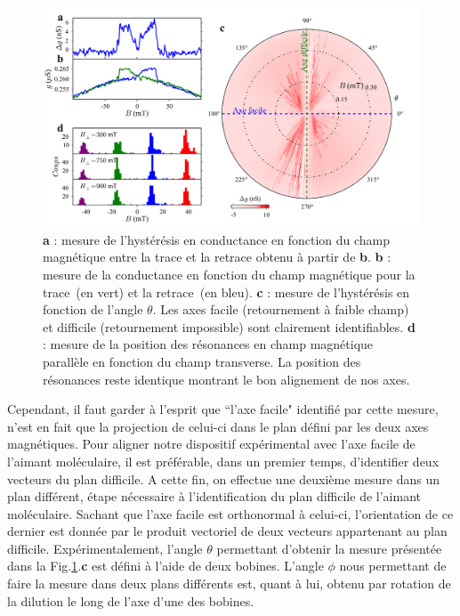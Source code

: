 \begin{figure}
\includegraphics[scale=0.45]{Resultats/Alignement/Alignement.pdf} 
\caption{\textbf{a} : mesure de l’hystérésis en conductance en fonction du champ magnétique entre la trace et la retrace obtenu à partir de \textbf{b}. \textbf{b} : mesure de la conductance en fonction du champ magnétique pour la trace~(en vert) et la retrace~(en bleu). \textbf{c} : mesure de l'hystérésis en fonction de l'angle $\theta$. Les axes facile (retournement à faible champ) et difficile (retournement impossible) sont clairement identifiables. \textbf{d} : mesure de la position des résonances en champ magnétique parallèle en fonction du champ transverse. La position des résonances reste identique montrant le bon alignement de nos axes.}
\label{alignement}
\end{figure}

Cependant, il faut garder à l'esprit que ``l'axe facile" identifié par cette mesure, n'est en fait que la projection de celui-ci dans le plan défini par les deux axes magnétiques. Pour aligner notre dispositif expérimental avec l'axe facile de l'aimant moléculaire, il est préférable, dans un premier temps, d'identifier deux vecteurs du plan difficile. A cette fin, on effectue une deuxième mesure dans un plan différent, étape nécessaire à l'identification du plan difficile de l'aimant moléculaire. Sachant que l'axe facile est orthonormal à celui-ci, l'orientation de ce dernier est donnée par le produit vectoriel de deux vecteurs appartenant au plan difficile. Expérimentalement, l'angle $\theta$ permettant d'obtenir la mesure présentée dans la Fig.\ref{alignement}.\textbf{c} est défini à l'aide de deux bobines. L'angle $\phi$ nous permettant de faire la mesure dans deux plans différents est, quant à lui, obtenu par rotation de la dilution le long de l'axe d'une des bobines.


